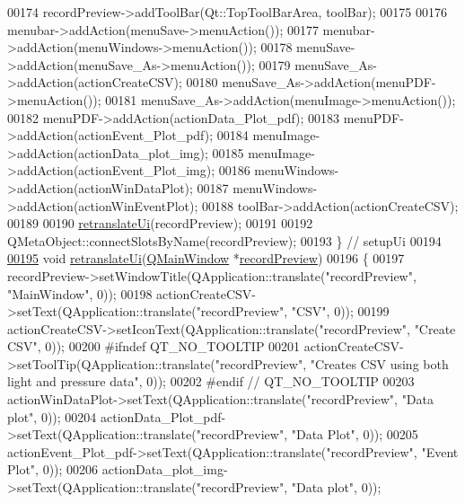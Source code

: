 \begin{DoxyCode}
00174         recordPreview->addToolBar(Qt::TopToolBarArea, toolBar);
00175 
00176         menubar->addAction(menuSave->menuAction());
00177         menubar->addAction(menuWindows->menuAction());
00178         menuSave->addAction(menuSave\_As->menuAction());
00179         menuSave\_As->addAction(actionCreateCSV);
00180         menuSave\_As->addAction(menuPDF->menuAction());
00181         menuSave\_As->addAction(menuImage->menuAction());
00182         menuPDF->addAction(actionData\_Plot\_pdf);
00183         menuPDF->addAction(actionEvent\_Plot\_pdf);
00184         menuImage->addAction(actionData\_plot\_img);
00185         menuImage->addAction(actionEvent\_Plot\_img);
00186         menuWindows->addAction(actionWinDataPlot);
00187         menuWindows->addAction(actionWinEventPlot);
00188         toolBar->addAction(actionCreateCSV);
00189 
00190         \hyperlink{a00081_ad30b831cfb4b32956fe67a79748ba194}{retranslateUi}(recordPreview);
00191 
00192         QMetaObject::connectSlotsByName(recordPreview);
00193     \} \textcolor{comment}{// setupUi}
00194 
\hypertarget{a00140_source_l00195}{}\hyperlink{a00081_ad30b831cfb4b32956fe67a79748ba194}{00195}     \textcolor{keywordtype}{void} \hyperlink{a00081_ad30b831cfb4b32956fe67a79748ba194}{retranslateUi}(\hyperlink{a00058}{QMainWindow} *\hyperlink{a00073}{recordPreview})
00196     \{
00197         recordPreview->setWindowTitle(QApplication::translate(\textcolor{stringliteral}{"recordPreview"}, \textcolor{stringliteral}{"MainWindow"}, 0));
00198         actionCreateCSV->setText(QApplication::translate(\textcolor{stringliteral}{"recordPreview"}, \textcolor{stringliteral}{"CSV"}, 0));
00199         actionCreateCSV->setIconText(QApplication::translate(\textcolor{stringliteral}{"recordPreview"}, \textcolor{stringliteral}{"Create CSV"}, 0));
00200 \textcolor{preprocessor}{#ifndef QT\_NO\_TOOLTIP}
00201         actionCreateCSV->setToolTip(QApplication::translate(\textcolor{stringliteral}{"recordPreview"}, \textcolor{stringliteral}{"Creates CSV using both light
       and pressure data"}, 0));
00202 \textcolor{preprocessor}{#endif // QT\_NO\_TOOLTIP}
00203         actionWinDataPlot->setText(QApplication::translate(\textcolor{stringliteral}{"recordPreview"}, \textcolor{stringliteral}{"Data plot"}, 0));
00204         actionData\_Plot\_pdf->setText(QApplication::translate(\textcolor{stringliteral}{"recordPreview"}, \textcolor{stringliteral}{"Data Plot"}, 0));
00205         actionEvent\_Plot\_pdf->setText(QApplication::translate(\textcolor{stringliteral}{"recordPreview"}, \textcolor{stringliteral}{"Event Plot"}, 0));
00206         actionData\_plot\_img->setText(QApplication::translate(\textcolor{stringliteral}{"recordPreview"}, \textcolor{stringliteral}{"Data plot"}, 0));

\end{DoxyCode}
